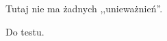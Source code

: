 \documentclass{article}
\begin{document}
Tutaj nie ma żadnych ,,unieważnień''.

Do testu.
\end{document}
